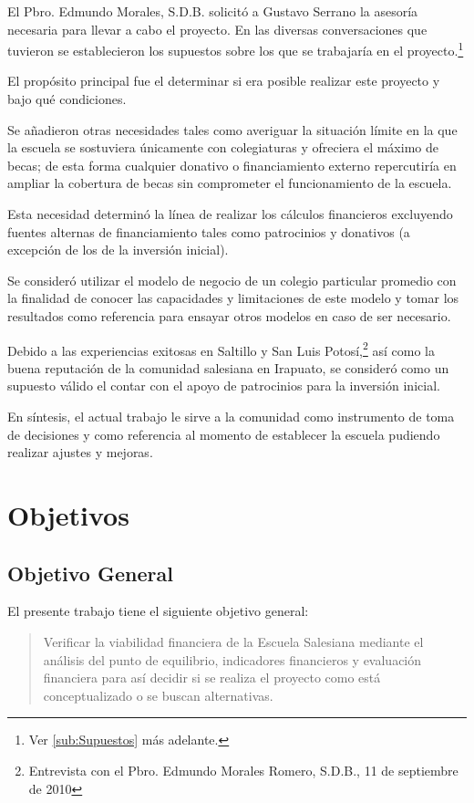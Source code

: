 El Pbro. Edmundo Morales, S.D.B. solicitó a Gustavo Serrano la asesoría necesaria para llevar a cabo el proyecto. En las diversas conversaciones que tuvieron se establecieron los supuestos sobre los que se trabajaría en el proyecto.\footnote{Ver \ref{sub:Supuestos} más adelante.}

El propósito principal fue el determinar si era posible realizar este proyecto y bajo qué condiciones.

Se añadieron otras necesidades tales como averiguar la situación límite en la que la escuela se sostuviera únicamente con colegiaturas y ofreciera el máximo de becas; de esta forma cualquier donativo o financiamiento externo repercutiría en ampliar la cobertura de becas sin comprometer el funcionamiento de la escuela.

Esta necesidad determinó la línea de realizar los cálculos financieros excluyendo fuentes alternas de financiamiento tales como patrocinios y donativos (a excepción de los de la inversión inicial).

Se consideró utilizar el modelo de negocio de un colegio particular promedio con la finalidad de conocer las capacidades y limitaciones de este modelo y tomar los resultados como referencia para ensayar otros modelos en caso de ser necesario.

Debido a las experiencias exitosas en Saltillo y San Luis Potosí,\footnote{Entrevista con el Pbro. Edmundo Morales Romero, S.D.B., 11 de septiembre de 2010} así como la buena reputación de la comunidad salesiana en Irapuato, se consideró como un supuesto válido el contar con el apoyo de patrocinios para la inversión inicial.

En síntesis, el actual trabajo le sirve a la comunidad como instrumento de toma de decisiones y como referencia al momento de establecer la escuela pudiendo realizar ajustes y mejoras.

\section{Objetivos}

\subsection{Objetivo General}
\label{sub:ObjetivoGeneral}

El presente trabajo tiene el siguiente objetivo general:

\begin{quotation}
	Verificar la viabilidad financiera de la Escuela Salesiana mediante el análisis del punto de equilibrio, indicadores financieros y evaluación financiera para así decidir si se realiza el proyecto como está conceptualizado o se buscan alternativas.
\end{quotation}

